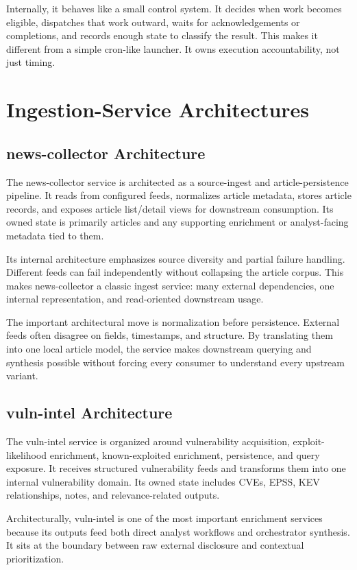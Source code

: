 Internally, it behaves like a small control system. It decides when work becomes eligible, dispatches that work outward, waits for acknowledgements or completions, and records enough state to classify the result. This makes it different from a simple cron-like launcher. It owns execution accountability, not just timing.

\section{Ingestion-Service Architectures}
\subsection{news-collector Architecture}
The news-collector service is architected as a source-ingest and article-persistence pipeline. It reads from configured feeds, normalizes article metadata, stores article records, and exposes article list/detail views for downstream consumption. Its owned state is primarily articles and any supporting enrichment or analyst-facing metadata tied to them.

Its internal architecture emphasizes source diversity and partial failure handling. Different feeds can fail independently without collapsing the article corpus. This makes news-collector a classic ingest service: many external dependencies, one internal representation, and read-oriented downstream usage.

The important architectural move is normalization before persistence. External feeds often disagree on fields, timestamps, and structure. By translating them into one local article model, the service makes downstream querying and synthesis possible without forcing every consumer to understand every upstream variant.

\subsection{vuln-intel Architecture}
The vuln-intel service is organized around vulnerability acquisition, exploit-likelihood enrichment, known-exploited enrichment, persistence, and query exposure. It receives structured vulnerability feeds and transforms them into one internal vulnerability domain. Its owned state includes CVEs, EPSS, KEV relationships, notes, and relevance-related outputs.

Architecturally, vuln-intel is one of the most important enrichment services because its outputs feed both direct analyst workflows and orchestrator synthesis. It sits at the boundary between raw external disclosure and contextual prioritization.

